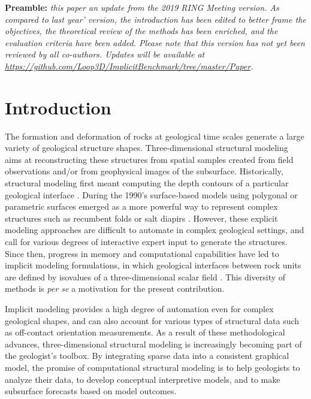 \documentclass[preprint]{ring20}
\begin{document}
\textbf{Preamble: } \textit{this paper an update from the 2019 RING Meeting version. As compared to last year' version, the introduction has been edited to better frame the objectives, the theoretical review of the methods has been enriched, and the evaluation criteria have been added. Please note that this version has not yet been reviewed by all co-authors. Updates will be available at \url{https://github.com/Loop3D/ImplicitBenchmark/tree/master/Paper}.}

\section*{Introduction}

The formation and deformation of rocks at geological time scales generate a large variety of geological structure shapes. Three-dimensional structural modeling aims at reconstructing these structures from spatial samples created from field observations and/or from geophysical images of the subsurface. Historically, structural modeling first meant computing the depth contours of a particular geological interface \citep[e.g.,][]{Walters1969AB,Hardy1971JGR,Briggs1974G,Bolondi1976G}. During the 1990's surface-based models using polygonal or parametric surfaces emerged as a more powerful way to represent complex structures such as recumbent folds or salt diapirs \citep{Mallet1992CD,deKemp1999CG}. However, these explicit modeling approaches are difficult to automate in complex geological settings, and call for various degrees of interactive expert input to generate the structures. Since then, progress in memory and computational capabilities have led to implicit modeling formulations, in which geological interfaces between rock units are defined by isovalues of a three-dimensional scalar field \citep[][]{Lajaunie1997MG,Cowan2002ASGMEM,Calcagno2008PEPI,Frank2007CG,Caumon2013GaRSITo,Souche20137ECEISE2,Hillier2014MG,Laurent2016MG,Laurent2016EaPSL,Martin2017CG,Grose2017JSG,delaVarga2018GMDD,Irakarama2018EAGE,Grose2019JoSG,Renaudeau2019BEMRMX,Renaudeau2019MG,Manchuk2019CG}. This diversity of methods is \textit{per se} a motivation for the present contribution. 

Implicit modeling provides a high degree of automation even for complex geological shapes, and can also account for various types of structural data such as off-contact orientation  measurements. As a result of these methodological advances, three-dimensional structural modeling is increasingly becoming part of the geologist's toolbox. By integrating sparse data into a consistent graphical model, the promise of computational structural modeling is to help geologists to analyze their data, to develop conceptual interpretive models, and to make subsurface forecasts based on model outcomes. 
\end{document}
